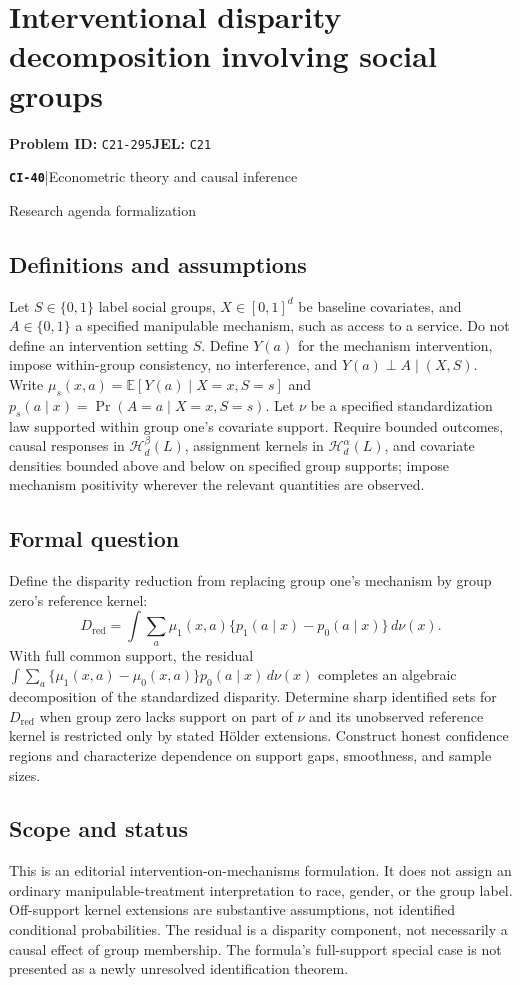 \documentclass[11pt,a4paper]{article}
\newcommand{\E}{\mathbb E}
\newcommand{\entrymeta}[3]{{\sffamily\small\color{muted}\textbf{\texttt{#1}}\quad|\quad #2\par #3\par}}
\begin{document}
\section*{Interventional disparity decomposition involving social groups}
\textbf{Problem ID:} \texttt{C21-295}\quad \textbf{JEL:} \texttt{C21}\par
\label{problem:OP-0519}
\label{beyond:CI-40}
\entrymeta{CI-40}{Econometric theory and causal inference}{Research agenda formalization}
\subsection*{Definitions and assumptions}
Let $S\in\{0,1\}$ label social groups, $X\in[0,1]^d$ be baseline covariates, and $A\in\{0,1\}$ a specified manipulable mechanism, such as access to a service. Do not define an intervention setting $S$. Define $Y(a)$ for the mechanism intervention, impose within-group consistency, no interference, and $Y(a)\perp A\mid(X,S)$. Write $\mu_s(x,a)=\E[Y(a)\mid X=x,S=s]$ and $p_s(a\mid x)=\Pr(A=a\mid X=x,S=s)$. Let $\nu$ be a specified standardization law supported within group one's covariate support. Require bounded outcomes, causal responses in $\mathcal H_d^\beta(L)$, assignment kernels in $\mathcal H_d^\alpha(L)$, and covariate densities bounded above and below on specified group supports; impose mechanism positivity wherever the relevant quantities are observed.
\subsection*{Formal question}
Define the disparity reduction from replacing group one's mechanism by group zero's reference kernel:
\[
 D_{\mathrm{red}}=\int\sum_a\mu_1(x,a)\{p_1(a\mid x)-p_0(a\mid x)\}\,d\nu(x).
\]
With full common support, the residual $\int\sum_a\{\mu_1(x,a)-\mu_0(x,a)\}p_0(a\mid x)\,d\nu(x)$ completes an algebraic decomposition of the standardized disparity. Determine sharp identified sets for $D_{\mathrm{red}}$ when group zero lacks support on part of $\nu$ and its unobserved reference kernel is restricted only by stated H\"older extensions. Construct honest confidence regions and characterize dependence on support gaps, smoothness, and sample sizes.
\subsection*{Scope and status}
This is an editorial intervention-on-mechanisms formulation. It does not assign an ordinary manipulable-treatment interpretation to race, gender, or the group label. Off-support kernel extensions are substantive assumptions, not identified conditional probabilities. The residual is a disparity component, not necessarily a causal effect of group membership. The formula's full-support special case is not presented as a newly unresolved identification theorem.
\end{document}
